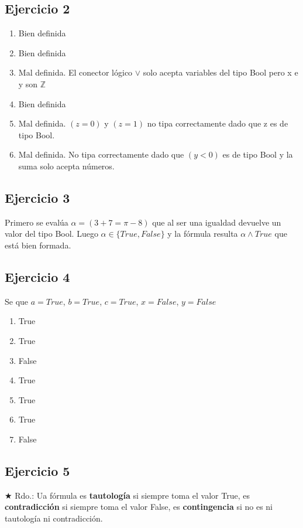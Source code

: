 \subsection{Ejercicio 2}
\begin{enumerate}[label=(\alph*)]
    \item Bien definida
    \item Bien definida
    \item Mal definida. El conector lógico $\vee$ solo acepta variables del tipo Bool pero x e y son $\mathbb{Z}$ 
    \item Bien definida
    \item Mal definida. $(z = 0)$ y $(z = 1)$ no tipa correctamente dado que z es de tipo Bool.
    \item Mal definida. No tipa correctamente dado que $(y < 0)$ es de tipo Bool y la suma solo acepta números.
\end{enumerate}

\subsection{Ejercicio 3}
Primero se evalúa $ \alpha = (3+7 = \pi - 8)$ que al ser una igualdad devuelve un valor del tipo Bool. Luego $\alpha \in \{True, False\}$
y la fórmula resulta $\alpha \wedge True$ que está bien formada.

\subsection{Ejercicio 4}
Se que $a = True$, $b = True$, $c = True$, $x = False$, $y = False$

\begin{enumerate}[label=(\alph*)]
    \item True
    \item True
    \item False
    \item True
    \item True
    \item True
    \item False
\end{enumerate}

\subsection{Ejercicio 5}
$\bigstar$ Rdo.: Ua fórmula es \textbf{tautología} si siempre toma el valor True, es \textbf{contradicción} si siempre toma el valor False,
es \textbf{contingencia} si no es ni tautología ni contradicción.

